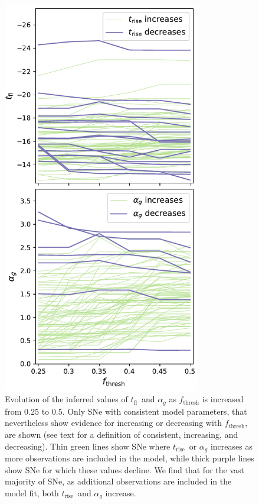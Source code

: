 \documentclass[twocolumn]{./aastex63}
\newcommand{\tfl}{$t_\mathrm{fl}$}
\newcommand{\trise}{$t_\mathrm{rise}$}
\begin{document}
\begin{figure}[ht]
    \centering
    \includegraphics[width=3.4in]{./figures/flux_frac.pdf}
    \caption{Evolution of the inferred values of \tfl\ and $\alpha_g$ as
    $f_\mathrm{thresh}$ is increased from 0.25 to 0.5. Only SNe with
    consistent model parameters, that nevertheless show evidence for
    increasing or decreasing with $f_\mathrm{thresh}$, are shown (see text for
    a definition of consistent, increasing, and decreasing). Thin green lines
    show SNe where \trise\ or $\alpha_g$ increases as more observations are
    included in the model, while thick purple lines show SNe for which these
    values decline. We find that for the vast majority of SNe, as additional
    observations are included in the model fit, both \trise\ and $\alpha_g$
    increase.}
    \label{fig:flux_frac}
\end{figure}
\end{document}

